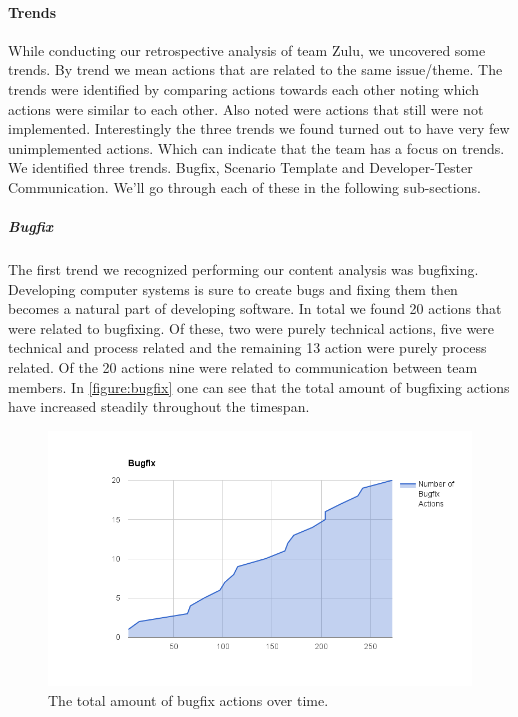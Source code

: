 \paragraph{Trends}
While conducting our retrospective analysis of team Zulu, we uncovered some trends. By trend we mean actions that are related to the same issue/theme. The trends were identified by comparing actions towards each other noting which actions were similar to each other. Also noted were actions that still were not implemented. Interestingly the three trends we found turned out to have very few unimplemented actions. Which can indicate that the team has a focus on trends. We identified three trends. Bugfix, Scenario Template and Developer-Tester Communication. We'll go through each of these in the following sub-sections. 

\subparagraph{Bugfix}
\label{section:bugfix}
The first trend we recognized performing our content analysis was bugfixing. Developing computer systems is sure to create bugs and fixing them then becomes a natural part of developing software. In total we found 20 actions that were related to bugfixing. Of these, two were purely technical actions, five were technical and process related and the remaining 13 action were purely process related. Of the 20 actions nine were related to communication between team members. In \autoref{figure:bugfix} one can see that the total amount of bugfixing actions have increased steadily throughout the timespan. 

\begin{figure}[!h]
	\centering
	\includegraphics[width=\textwidth, keepaspectratio]{figures/bugfix.png}
	\caption{The total amount of bugfix actions over time.}
	\label{figure:bugfix}
\end{figure}

